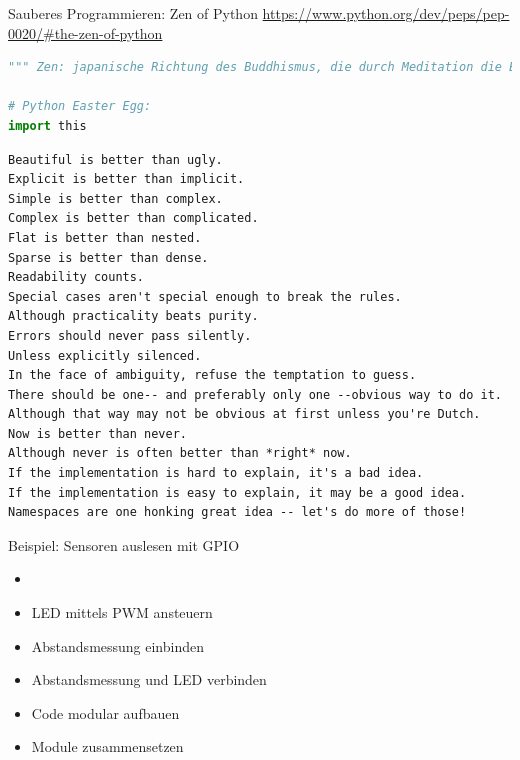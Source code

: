 \begin{frame}[fragile]{Sauberes Programmieren: Zen of Python}
\url{https://www.python.org/dev/peps/pep-0020/#the-zen-of-python}
\begin{lstlisting}[language=Python]
""" Zen: japanische Richtung des Buddhismus, die durch Meditation die Erfahrung der Einheit allen Seins und damit tätige Lebenskraft und größte Selbstbeherrschung zu erreichen sucht. """

# Python Easter Egg:
import this
\end{lstlisting}
\begin{lstlisting}	
Beautiful is better than ugly.
Explicit is better than implicit.
Simple is better than complex.
Complex is better than complicated.
Flat is better than nested.
Sparse is better than dense.
Readability counts.
Special cases aren't special enough to break the rules.
Although practicality beats purity.
Errors should never pass silently.
Unless explicitly silenced.
In the face of ambiguity, refuse the temptation to guess.
There should be one-- and preferably only one --obvious way to do it.
Although that way may not be obvious at first unless you're Dutch.
Now is better than never.
Although never is often better than *right* now.
If the implementation is hard to explain, it's a bad idea.
If the implementation is easy to explain, it may be a good idea.
Namespaces are one honking great idea -- let's do more of those!
\end{lstlisting}
\end{frame}


\begin{frame}{Beispiel: Sensoren auslesen mit GPIO}
    \begin{itemize}
    \setlength{\itemindent}{.4in}
     \item [\textbf{ Ziele}]
    \end{itemize}
    \begin{itemize}
        \item  LED mittels PWM ansteuern
        \item  Abstandsmessung einbinden
        \item  Abstandsmessung und LED verbinden
        \item  Code modular aufbauen
        \item  Module zusammensetzen 
     \end{itemize}
\end{frame}


